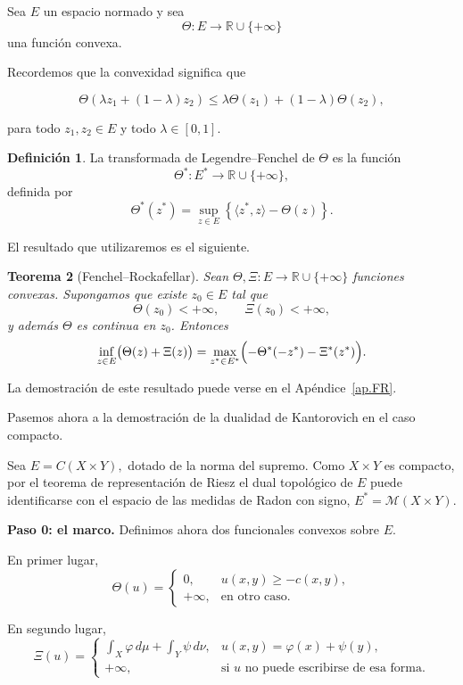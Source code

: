 \documentclass[12pt, a4paper]{amsbook}
\newtheorem{teo}{Teorema}[section]
\theoremstyle{remark}
\theoremstyle{definition}
\newtheorem{defi}[teo]{Definición}
\numberwithin{section}{chapter}
\numberwithin{subsection}{section}
\numberwithin{equation}{section}
\numberwithin{figure}{chapter}
\begin{document}
Sea $E$ un espacio normado y sea
\[
\Theta:E\longrightarrow\mathbb R\cup\{+\infty\}
\]
una función convexa.

Recordemos que la convexidad significa que

\[
\Theta(\lambda z_1+(1-\lambda)z_2)
\le
\lambda\Theta(z_1)
+
(1-\lambda)\Theta(z_2),
\]

para todo $z_1,z_2\in E$ y todo $\lambda\in[0,1]$.

\begin{defi}
La transformada de Legendre--Fenchel de $\Theta$ es la función
\[
\Theta^*:E^*\longrightarrow\mathbb R\cup\{+\infty\},
\]
definida por
\[
\Theta^*(z^*)
=
\sup_{z\in E}
\left\{
\langle z^*,z\rangle-\Theta(z)
\right\}.
\]
\end{defi}

El resultado que utilizaremos es el siguiente.

\begin{teo}[Fenchel--Rockafellar]
Sean $\Theta,\Xi\colon E\to\mathbb R\cup\{+\infty\}$ funciones convexas. Supongamos que existe $z_0\in E$ tal que
\[
\Theta(z_0)<+\infty,
\qquad
\Xi(z_0)<+\infty,
\]
y además $\Theta$ es continua en $z_0$. Entonces
\[
\inf_{z\in E}
\bigl(\Theta(z)+\Xi(z)\bigr)
=
\max_{z^*\in E^*}
\Bigl(
-\Theta^*(-z^*)
-
\Xi^*(z^*)
\Bigr).
\]
\end{teo}

La demostración de este resultado puede verse en el Apéndice~\ref{ap.FR}.


Pasemos ahora a la demostración de la dualidad de Kantorovich en el caso
compacto.

Sea
\(
E=C(X\times Y),
\)
dotado de la norma del supremo. Como $X\times Y$ es compacto, por el teorema
de representación de Riesz el dual topológico de $E$ puede identificarse con
el espacio de las medidas de Radon con signo,
\(
E^*=\mathcal M(X\times Y).
\)

\medskip\noindent\textbf{Paso 0: el marco.}
Definimos ahora dos funcionales convexos sobre $E$.

En primer lugar,
\[
\Theta(u)
=
\begin{cases}
0,
&
u(x,y)\ge -c(x,y),
\\[1ex]
+\infty,
&
\text{en otro caso}.
\end{cases}
\]

En segundo lugar,
\[
\Xi(u)
=
\begin{cases}
\displaystyle
\int_X\varphi\,d\mu
+
\int_Y\psi\,d\nu,
&
u(x,y)=\varphi(x)+\psi(y),
\\[3ex]
+\infty,
&
\text{si }u
\text{ no puede escribirse de esa forma}.
\end{cases}
\]
\end{document}
